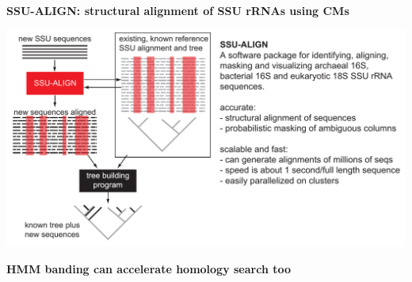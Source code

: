 \documentclass[landscape]{slides}
\begin{document}
\begin{slide}
\begin{center}
\textbf{SSU-ALIGN: structural alignment of SSU rRNAs using CMs}
\end{center}

\includegraphics[width=10.5in]{figs/seq2tree-2014-ssu-align}

\vfill
\end{slide}
\begin{slide}
\begin{center}
\textbf{HMM banding can accelerate homology search too}
\end{center}


\vfill
\end{slide}
\end{document}
